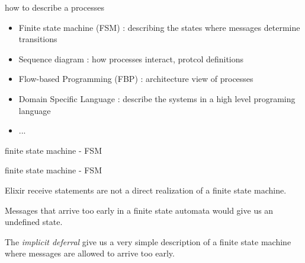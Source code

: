 \begin{frame}{how to describe a processes}

  \begin{itemize}
  \item Finite state machine (FSM) : describing the states where messages determine transitions \pause 
  \item Sequence diagram : how processes interact, protcol definitions \pause
  \item Flow-based Programming (FBP) : architecture view of processes
  \item Domain Specific Language : describe the systems in a high level programing language \pause
  \item  ... 
  \end{itemize}
  
\end{frame}



\begin{frame}{finite state machine - FSM}




\end{frame}


\begin{frame}{finite state machine - FSM}

Elixir receive statements are not a direct realization of a finite state machine.

\pause\vspace{10pt}

Messages that arrive too early in a finite state automata would give us an undefined state.

\pause\vspace{10pt}

The {\em implicit deferral} give us a very simple description of a
finite state machine where  messages are allowed to arrive too
early.


\end{frame}


